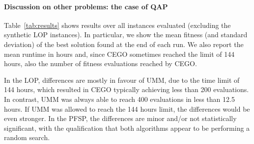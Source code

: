 \documentclass[sigconf,dvipsnames]{acmart}
\begin{document}
\paragraph{Discussion on other problems: the case of QAP}



Table~\ref{tab:results} shows results over all instances evaluated (excluding
the synthetic LOP instances). In particular, we show the mean fitness (and
standard deviation) of the best solution found at the end of each run. We also report the mean runtime in hours and, since CEGO sometimes reached the limit of 144 hours, also the number of fitness evaluations reached by CEGO.

In the LOP, differences are mostly in favour of UMM, due to the time limit of
144 hours, which resulted in CEGO typically achieving less than 200
evaluations. In contrast, UMM was always able to reach 400 evaluations in less
than 12.5 hours. If UMM was allowed to reach the 144 hours limit, the differences
would be even stronger.
%
In the PFSP, the differences are minor and/or not statistically
significant, with the qualification that both algorithms appear to be
performing a random search.
\end{document}
